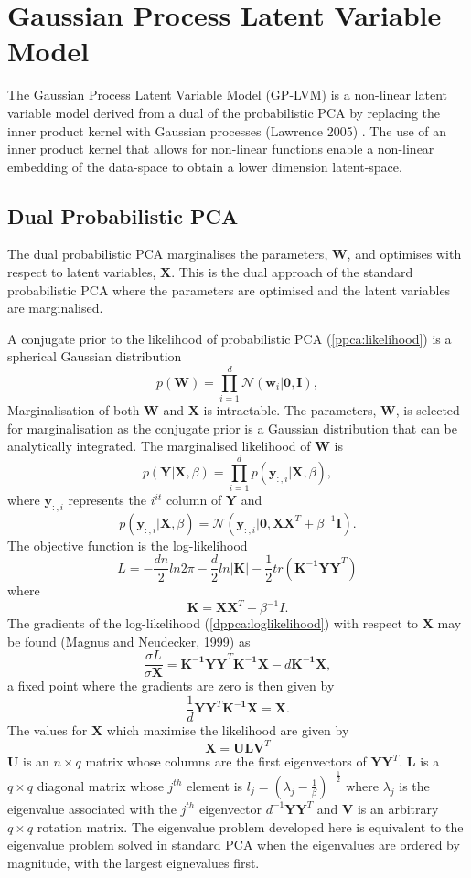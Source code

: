 \documentclass[ %
                    author={Dillon Keith Diep [INCOMPLETE DRAFT, NOT FOR SUBMISSION]},
                supervisor={Dr. Carl Henrik Ek},
                    degree={MEng},
                     title={ART-CG:},
                  subtitle={Assisted Real-Time Content Generation of 3D Hair Geometry},
                      type={Research},
                      year={2014} ]{dissertation}
\begin{document}
\section{Gaussian Process Latent Variable Model}
The Gaussian Process Latent Variable Model (GP-LVM) is a non-linear latent variable model derived from a dual of the probabilistic PCA by replacing the inner product kernel with Gaussian processes (Lawrence 2005) \cite{gplvm}. The use of an inner product kernel that allows for non-linear functions enable a non-linear embedding of the data-space to obtain a lower dimension latent-space. 

\subsection{Dual Probabilistic PCA}
The dual probabilistic PCA marginalises the parameters, $\mathbf{W}$, and optimises with respect to latent variables, $\mathbf{X}$. This is the dual approach of the standard probabilistic PCA where the parameters are optimised and the latent variables are marginalised.

A conjugate prior to the likelihood of probabilistic PCA (\ref{ppca:likelihood}) is a spherical Gaussian distribution
$$p(\mathbf{W})=\prod^d_{i=1}\mathcal{N}(\mathbf{w}_i|\mathbf{0,I}),$$
Marginalisation of both $\mathbf{W}$ and $\mathbf{X}$ is intractable. 
The parameters, $\mathbf{W}$, is selected for marginalisation as the conjugate prior is a Gaussian distribution that can be analytically integrated.
The marginalised likelihood of $\mathbf{W}$ is
$$p(\mathbf{Y|X},\beta)=\prod^d_{i=1}p(\mathbf{y}_{:,i}|\mathbf{X},\beta),$$
where $\mathbf{y}_{:,i}$ represents the $i^{it}$ column of $\mathbf{Y}$ and
$$p(\mathbf{y}_{:,i}|\mathbf{X},\beta)=\mathcal{N}(\mathbf{y}_{:,i}|\mathbf{0,XX}^T+\beta^{-1}\mathbf{I}).$$
The objective function is the log-likelihood
\begin{equation} \label{dppca:loglikelihood}
	L=-\frac{dn}{2}ln2\pi-\frac{d}{2}ln|\mathbf{K}|-\frac{1}{2}tr(\mathbf{K^{-1}YY}^T)
\end{equation}
where $$\mathbf{K=XX}^T+\beta^{-1}I.$$
{\color{red}The gradients of the log-likelihood (\ref{dppca:loglikelihood}) with respect to $\mathbf{X}$ may be found (Magnus and Neudecker, 1999) as}
$$\frac{\sigma L}{\sigma \mathbf{X}}=\mathbf{K^{-1}YY}^T\mathbf{K^{-1}X}-d\mathbf{K^{-1}X},$$
a fixed point where the gradients are zero is then given by 
$$\frac{1}{d}\mathbf{YY}^T\mathbf{K^{-1}X=X}.$$
The values for $\mathbf{X}$ which maximise the likelihood are given by 
$$\mathbf{X=ULV}^T$$
$\mathbf{U}$ is an $n \times q$ matrix whose columns are the first eigenvectors of $\mathbf{YY}^T$. $\mathbf{L}$ is a $q \times q$ diagonal matrix whose $j^{th}$ element is $l_j=(\lambda_j-\frac{1}{\beta})^{-\frac{1}{2}}$ where $\lambda_j$ is the eigenvalue associated with the $j^{th}$ eigenvector $d^{-1}\mathbf{YY}^T$ and $\mathbf{V}$ is an arbitrary $q\times q$ rotation matrix. The eigenvalue problem developed here is equivalent to the eigenvalue problem solved in standard PCA when the eigenvalues are ordered by magnitude, with the largest eignevalues first.
\end{document}

